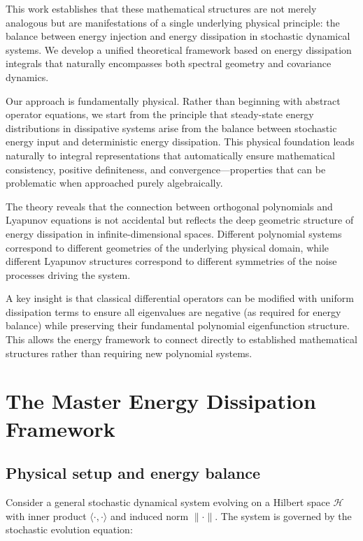 \documentclass[a4paper,12pt]{article}
\def\H{\mathcal{H}}
\newcommand{\inner}[2]{\langle #1, #2 \rangle}
\begin{document}
This work establishes that these mathematical structures are not merely analogous but are manifestations of a single underlying physical principle: the balance between energy injection and energy dissipation in stochastic dynamical systems. We develop a unified theoretical framework based on energy dissipation integrals that naturally encompasses both spectral geometry and covariance dynamics.

Our approach is fundamentally physical. Rather than beginning with abstract operator equations, we start from the principle that steady-state energy distributions in dissipative systems arise from the balance between stochastic energy input and deterministic energy dissipation. This physical foundation leads naturally to integral representations that automatically ensure mathematical consistency, positive definiteness, and convergence—properties that can be problematic when approached purely algebraically.

The theory reveals that the connection between orthogonal polynomials and Lyapunov equations is not accidental but reflects the deep geometric structure of energy dissipation in infinite-dimensional spaces. Different polynomial systems correspond to different geometries of the underlying physical domain, while different Lyapunov structures correspond to different symmetries of the noise processes driving the system.

A key insight is that classical differential operators can be modified with uniform dissipation terms to ensure all eigenvalues are negative (as required for energy balance) while preserving their fundamental polynomial eigenfunction structure. This allows the energy framework to connect directly to established mathematical structures rather than requiring new polynomial systems.

\section{The Master Energy Dissipation Framework}\label{sec:master}

\subsection{Physical setup and energy balance}

Consider a general stochastic dynamical system evolving on a Hilbert space $\H$ with inner product $\inner{\cdot}{\cdot}$ and induced norm $\|\cdot\|$. The system is governed by the stochastic evolution equation:
\end{document}
